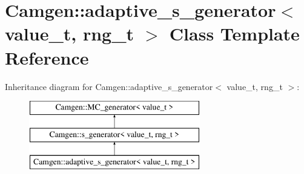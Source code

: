 \hypertarget{a00001}{\section{Camgen\-:\-:adaptive\-\_\-s\-\_\-generator$<$ value\-\_\-t, rng\-\_\-t $>$ Class Template Reference}
\label{a00001}
}
Inheritance diagram for Camgen\-:\-:adaptive\-\_\-s\-\_\-generator$<$ value\-\_\-t, rng\-\_\-t $>$\-:\begin{figure}[H]
\begin{center}
\leavevmode
\includegraphics[height=3.000000cm]{a00001}
\end{center}
\end{figure}
